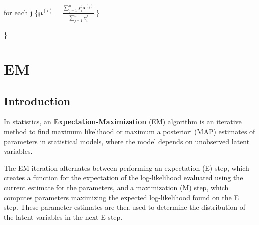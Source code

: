 	\qquad for each j \{$\mathbf{\mu}^{(i)} = \frac{\sum_{j = 1}^{n}\chi_i^j \boldsymbol x^{(j)} }{\sum_{j=1}^{n}\chi_i^j}.$\}

\}




\newpage 
\section{EM}

\subsection{Introduction}

	In statistics, an \textbf{Expectation-Maximization} (EM) algorithm is an iterative method to find maximum likelihood or maximum a posteriori (MAP) estimates of parameters in statistical models, where the model depends on unobserved latent variables. 

	The EM iteration alternates between performing an expectation (E) step, which creates a function for the expectation of the log-likelihood evaluated using the current estimate for the parameters, and a maximization (M) step, which computes parameters maximizing the expected log-likelihood found on the E step. These parameter-estimates are then used to determine the distribution of the latent variables in the next E step.




